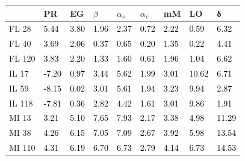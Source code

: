 \begin{tabular}{lllllllll}
\toprule
 & PR & EG & $β$ & $α_s$ & $α_v$ & mM & LO & δ \\
\midrule
FL 28 & \textcolor{black}{ 5.44 } & \textcolor{black}{ 3.80 } & \textcolor{black}{ 1.96 } & \textcolor{black}{ 2.37 } & \textcolor{black}{ 0.72 } & \textcolor{black}{ 2.22 } & \textcolor{black}{ 0.59 } & \textcolor{black}{ 6.32 } \\
FL 40 & \textcolor{black}{ 3.69 } & \textcolor{black}{ 2.06 } & \textcolor{black}{ 0.37 } & \textcolor{black}{ 0.65 } & \textcolor{black}{ 0.20 } & \textcolor{black}{ 1.35 } & \textcolor{black}{ 0.22 } & \textcolor{black}{ 4.41 } \\
FL 120 & \textcolor{black}{ 3.83 } & \textcolor{black}{ 2.20 } & \textcolor{black}{ 1.33 } & \textcolor{black}{ 1.60 } & \textcolor{black}{ 0.61 } & \textcolor{black}{ 1.96 } & \textcolor{black}{ 1.04 } & \textcolor{black}{ 6.62 } \\
IL 17 & \textcolor{black}{ -7.20 } & \textcolor{black}{ 0.97 } & \textcolor{black}{ 3.44 } & \textcolor{black}{ 5.62 } & \textcolor{black}{ 1.99 } & \textcolor{black}{ 3.01 } & \textcolor{black}{ 10.62 } & \textcolor{black}{ 6.71 } \\
IL 59 & \textcolor{black}{ -8.15 } & \textcolor{black}{ 0.02 } & \textcolor{black}{ 3.01 } & \textcolor{black}{ 5.61 } & \textcolor{black}{ 1.94 } & \textcolor{black}{ 3.23 } & \textcolor{black}{ 9.94 } & \textcolor{black}{ 2.87 } \\
IL 118 & \textcolor{black}{ -7.81 } & \textcolor{black}{ 0.36 } & \textcolor{black}{ 2.82 } & \textcolor{black}{ 4.42 } & \textcolor{black}{ 1.61 } & \textcolor{black}{ 3.01 } & \textcolor{black}{ 9.86 } & \textcolor{black}{ 1.91 } \\
MI 13 & \textcolor{black}{ 3.21 } & \textcolor{black}{ 5.10 } & \textcolor{black}{ 7.65 } & \textcolor{black}{ 7.93 } & \textcolor{black}{ 2.17 } & \textcolor{black}{ 3.38 } & \textcolor{black}{ 4.98 } & \textcolor{black}{ 11.29 } \\
MI 38 & \textcolor{black}{ 4.26 } & \textcolor{black}{ 6.15 } & \textcolor{black}{ 7.05 } & \textcolor{black}{ 7.09 } & \textcolor{black}{ 2.67 } & \textcolor{black}{ 3.92 } & \textcolor{black}{ 5.98 } & \textcolor{black}{ 13.54 } \\
MI 110 & \textcolor{black}{ 4.31 } & \textcolor{black}{ 6.19 } & \textcolor{black}{ 6.70 } & \textcolor{black}{ 6.73 } & \textcolor{black}{ 2.79 } & \textcolor{black}{ 4.14 } & \textcolor{black}{ 6.73 } & \textcolor{black}{ 14.53 } \\

\end{tabular}

